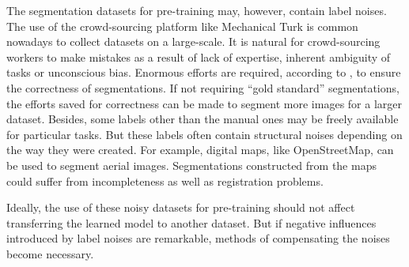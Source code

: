 
The segmentation datasets for pre-training may, however, contain label noises.
The use of the crowd-sourcing platform like Mechanical Turk is common nowadays to collect datasets on a large-scale.
It is natural for crowd-sourcing workers to make mistakes as a result of lack of expertise, inherent ambiguity of tasks or unconscious bias.
Enormous efforts are required, according to \cite{lin2014microsoft,everingham2015pascal}, to ensure the correctness of segmentations.
If not requiring ``gold standard'' segmentations, the efforts saved for correctness can be made to segment more images for a larger dataset.
Besides,  some labels other than the manual ones may be freely available for particular tasks.
But these labels often contain structural noises depending on the way they were created.
For example, digital maps, like OpenStreetMap, can be used to segment aerial images.
Segmentations constructed from the maps could suffer from incompleteness as well as registration problems.\cite{mnih2012learning}

Ideally, the use of these noisy datasets for pre-training should not affect transferring the learned model to another dataset.
But if negative influences introduced by label noises are remarkable, methods of compensating the noises become necessary.



